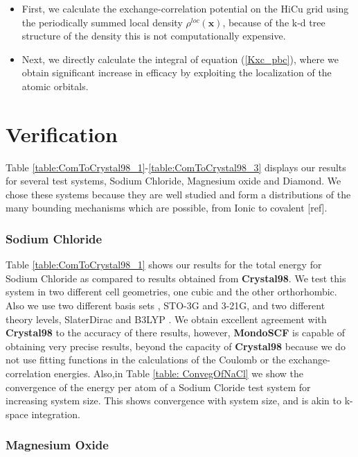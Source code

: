 \commentoutA{\documentclass[prb,aps,twocolumn,showpacs,twocolumngrid,superbib]{revtex4}}
\begin{document}
\begin{itemize}
\item First, we calculate the exchange-correlation potential on the HiCu
grid using the periodically summed local density \( \rho ^{loc}\left( \mathbf{x}\right)  \),
because of the k-d tree structure of the density this is not computationally
expensive.
\item Next, we directly calculate the integral of equation (\ref{Kxc_pbc}),
where we obtain significant increase in efficacy by exploiting the
localization of the atomic orbitals. 
\end{itemize}

\section{Verification}

Table \ref{table:ComToCrystal98_1}-\ref{table:ComToCrystal98_3}
displays our results for several test systems, Sodium Chloride, Magnesium
oxide and Diamond. We chose these systems because they are well studied
and form a distributions of the many bounding mechanisms which are
possible, from Ionic to covalent {[}ref{]}.


\subsubsection{Sodium Chloride}

Table \ref{table:ComToCrystal98_1} shows our results for the total
energy for Sodium Chloride as compared to results obtained from \textbf{Crystal98}.
We test this system in two different cell geometries, one cubic and
the other orthorhombic. Also we use two different basis sets , STO-3G
and 3-21G, and two different theory levels, SlaterDirac and B3LYP
. We obtain excellent agreement with \textbf{Crystal98} to the accuracy
of there results, however, \textbf{MondoSCF} is capable of obtaining
very precise results, beyond the capacity of \textbf{Crystal98} because
we do not use fitting functions in the calculations of the Coulomb
or the exchange-correlation energies. Also,in Table \ref{table: ConvegOfNaCl}
we show the convergence of the energy per atom of a Sodium Cloride
test system for increasing system size. This shows convergence with
system size, and is akin to k-space integration. 


\subsubsection{Magnesium Oxide}
\end{document}
